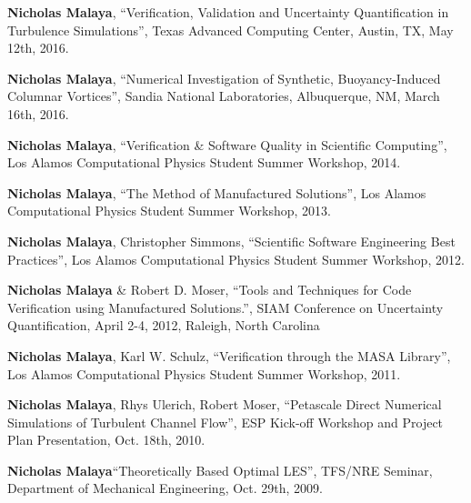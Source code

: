 \blankline

\textbf{Nicholas Malaya}, ``Verification, Validation and Uncertainty Quantification in Turbulence Simulations'', Texas Advanced Computing Center, 
		 Austin, TX, May 12th, 2016. 

\blankline

\textbf{Nicholas Malaya}, ``Numerical Investigation of Synthetic, Buoyancy-Induced Columnar Vortices'', Sandia National Laboratories, 
		 Albuquerque, NM, March 16th, 2016. 

\blankline

\textbf{Nicholas Malaya}, ``Verification \& Software Quality in Scientific
      Computing'', Los Alamos Computational Physics Student Summer
      Workshop, 2014. 

\blankline

\textbf{Nicholas Malaya}, ``The Method of Manufactured Solutions'', Los Alamos
      Computational Physics Student Summer Workshop, 2013.

\blankline

\textbf{Nicholas Malaya}, Christopher Simmons, ``Scientific Software Engineering
      Best Practices'', Los Alamos Computational Physics Student Summer
      Workshop, 2012.

\blankline

\textbf{Nicholas Malaya} \& Robert D. Moser, ``Tools and Techniques for Code
Verification using Manufactured Solutions.'', SIAM Conference on
Uncertainty Quantification, April 2-4, 2012, Raleigh, North Carolina 

\blankline

\textbf{Nicholas Malaya}, Karl W. Schulz, ``Verification through the MASA
      Library'', Los Alamos Computational Physics Student Summer
      Workshop, 2011.

\blankline

\textbf{Nicholas Malaya}, Rhys Ulerich, Robert Moser, ``Petascale Direct
Numerical Simulations of Turbulent Channel Flow'', ESP Kick-off
Workshop and Project Plan Presentation, Oct. 18th, 2010.

\blankline

\textbf{Nicholas Malaya}``Theoretically Based Optimal LES'', TFS/NRE
Seminar, Department of Mechanical Engineering, Oct. 29th, 2009. 


